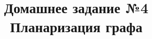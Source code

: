 \documentclass[11pt]{article}
\title{Домашнее задание №4\\Планаризация графа}
\begin{document}
    
    \maketitle
    \begin{comment}
    
    
    

    
            \begin{tcolorbox}[breakable, size=fbox, boxrule=.5pt, pad at break*=1mm, opacityfill=0]
\begin{Verbatim}[commandchars=\\\{\}]
EdgeDataView([(0, 1, \{'weight': 3\}), (0, 3, \{'weight': 2\}), (0, 5, \{'weight':
1\}), (0, 6, \{'weight': 5\}), (0, 7, \{'weight': 4\}), (0, 8, \{'weight': 4\}), (0,
11, \{'weight': 1\}), (1, 2, \{'weight': 3\}), (1, 3, \{'weight': 2\}), (1, 5,
\{'weight': 3\}), (1, 7, \{'weight': 4\}), (1, 9, \{'weight': 5\}), (1, 10, \{'weight':
4\}), (1, 11, \{'weight': 4\}), (2, 6, \{'weight': 2\}), (2, 8, \{'weight': 4\}), (2,
9, \{'weight': 1\}), (2, 10, \{'weight': 4\}), (2, 11, \{'weight': 5\}), (3, 6,
\{'weight': 1\}), (3, 9, \{'weight': 1\}), (3, 10, \{'weight': 2\}), (4, 7, \{'weight':
4\}), (4, 8, \{'weight': 1\}), (5, 11, \{'weight': 1\}), (6, 7, \{'weight': 4\}), (6,
8, \{'weight': 4\}), (6, 11, \{'weight': 5\}), (7, 8, \{'weight': 1\}), (7, 9,
\{'weight': 2\}), (7, 10, \{'weight': 5\}), (7, 11, \{'weight': 4\}), (8, 10,
\{'weight': 5\}), (10, 11, \{'weight': 5\})])
\end{Verbatim}
\end{tcolorbox}
        
    \begin{center}
    \adjustimage{max size={0.9\linewidth}{0.9\paperheight}}{HamiltonianCycle_files/HamiltonianCycle_3_0.png}
    \end{center}
    { \hspace*{\fill} \\}
    
    \begin{Verbatim}[commandchars=\\\{\}]
Для поиска гамильтонового цикла воспользуемся алгоритмом перебора с возвратом
Включаем в S вершину v0. S = ['v0']
Возможная вершина: v1. S = ['v0', 'v1']
    \end{Verbatim}

    \begin{center}
    \adjustimage{max size={0.9\linewidth}{0.9\paperheight}}{HamiltonianCycle_files/HamiltonianCycle_6_1.png}
    \end{center}
    { \hspace*{\fill} \\}
    

\end{comment}
\end{document}
